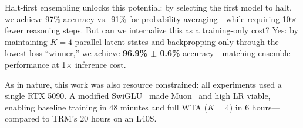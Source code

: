 Halt-first ensembling unlocks this potential: by selecting the first model to halt, we achieve 97\% accuracy vs.\ 91\% for probability averaging---while requiring 10$\times$ fewer reasoning steps. But can we internalize this as a training-only cost? Yes: by maintaining $K{=}4$ parallel latent states and backpropping only through the lowest-loss ``winner,'' we achieve \textbf{96.9\% $\pm$ 0.6\%} accuracy---matching ensemble performance at 1$\times$ inference cost.

As in nature, this work was also resource constrained: all experiments used a single RTX 5090. A modified SwiGLU~\citep{shazeer2020swiglu} made Muon~\citep{jordan2024muon} and high LR viable, enabling baseline training in 48 minutes and full WTA ($K{=}4$) in 6 hours---compared to TRM's 20 hours on an L40S.
